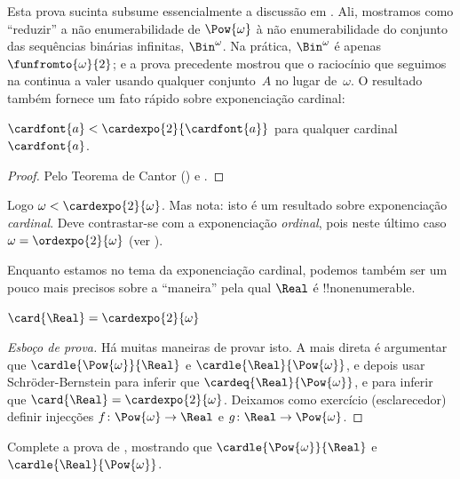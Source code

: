\documentclass[../../../include/open-logic-section]{subfiles}
\begin{document}
Esta prova sucinta subsume essencialmente a discussão em
. Ali, mostramos como ``reduzir'' a
não enumerabilidade de $\Pow{\omega}$ à não enumerabilidade do conjunto das
sequências binárias infinitas, $\Bin^\omega$. Na prática, $\Bin^{\omega}$ é
apenas $\funfromto{\omega}{2}$; e a prova precedente mostrou que o
raciocínio que seguimos na  continua a
valer usando qualquer conjunto~$A$ no lugar de~$\omega$. O resultado também fornece
um fato rápido sobre exponenciação cardinal:

\begin{cor}
$\cardfont{a} < \cardexpo{2}{\cardfont{a}}$ para qualquer cardinal~$\cardfont{a}$.
\end{cor}

\begin{proof}
Pelo Teorema de Cantor () e
.
\end{proof}
\noindent
Logo $\omega < \cardexpo{2}{\omega}$. Mas nota: isto é um resultado sobre
exponenciação \emph{cardinal}. Deve contrastar-se com a
exponenciação \emph{ordinal}, pois neste último caso $\omega =
\ordexpo{2}{\omega}$ (ver ).

Enquanto estamos no tema da exponenciação cardinal, podemos também ser
um pouco mais precisos sobre a ``maneira'' pela qual $\Real$ é
!!{nonenumerable}.

\begin{thm}
$\card{\Real} = \cardexpo{2}{\omega}$
\end{thm}

\begin{proof}[Esboço de prova]
Há muitas maneiras de provar isto. A mais direta é
argumentar que $\cardle{\Pow{\omega}}{\Real}$ e
$\cardle{\Real}{\Pow{\omega}}$, e depois usar Schr\"oder-Bernstein para
inferir que $\cardeq{\Real}{\Pow{\omega}}$, e
 para inferir
que $\card{\Real} = \cardexpo{2}{\omega}$. Deixamos como
exercício (esclarecedor) definir injecções $f \colon
\Pow{\omega} \to \Real$ e $g \colon \Real \to \Pow{\omega}$.
\end{proof}

\begin{prob}
Complete a prova de
,
mostrando que $\cardle{\Pow{\omega}}{\Real}$ e
$\cardle{\Real}{\Pow{\omega}}$.
\end{prob}
\end{document}
